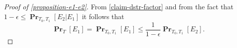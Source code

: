 \documentclass[unicode,review]{siamart1116}
\newcommand{\probs}[2]{\operatorname{\mathbf{Pr}}_{{#1}}\left[{#2}\right]}
\numberwithin{theorem}{section}
\begin{document}
\begin{appendix}
\begin{proof}[Proof of \cref{proposition-e1-e2}]
From \cref{claim-dstr-factor} and from the fact that $1 - \epsilon \leq \probs{T_0, T_1}{E_2 | E_1}$ it follows that \[\probs{T}{E_1} = \probs{T_0, T_1}{E_1} \leq \frac{1}{1-\epsilon}\probs{T_0, T_1}{E_2}.\]
\end{proof}
\end{appendix}
\end{document}
